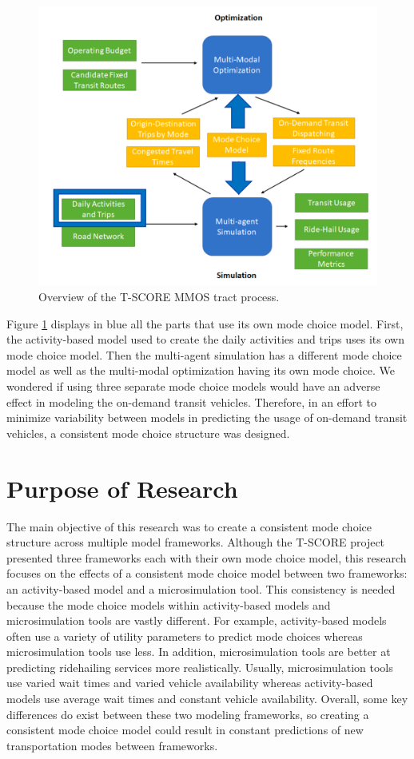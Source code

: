 \documentclass[12pt, oneside, openright]{byuthesis}
\begin{document}
\begin{figure}

{\centering \includegraphics[width=0.75\linewidth]{pics/mmos_mode} 

}

\caption{Overview of the T-SCORE MMOS tract process.}\label{fig:mmos}
\end{figure}

Figure \ref{fig:mmos} displays in blue all the parts that use its own mode choice model. First, the activity-based model used to create the daily activities and trips uses its own mode choice model. Then the multi-agent simulation has a different mode choice model as well as the multi-modal optimization having its own mode choice. We wondered if using three separate mode choice models would have an adverse effect in modeling the on-demand transit vehicles. Therefore, in an effort to minimize variability between models in predicting the usage of on-demand transit vehicles, a consistent mode choice structure was designed.

\hypertarget{purpose-of-research}{%
\section{Purpose of Research}\label{purpose-of-research}}

The main objective of this research was to create a consistent mode choice structure across multiple model frameworks. Although the T-SCORE project presented three frameworks each with their own mode choice model, this research focuses on the effects of a consistent mode choice model between two frameworks: an activity-based model and a microsimulation tool. This consistency is needed because the mode choice models within activity-based models and microsimulation tools are vastly different. For example, activity-based models often use a variety of utility parameters to predict mode choices whereas microsimulation tools use less. In addition, microsimulation tools are better at predicting ridehailing services more realistically. Usually, microsimulation tools use varied wait times and varied vehicle availability whereas activity-based models use average wait times and constant vehicle availability. Overall, some key differences do exist between these two modeling frameworks, so creating a consistent mode choice model could result in constant predictions of new transportation modes between frameworks.
\end{document}
